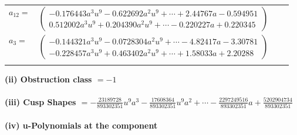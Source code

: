 \documentclass[1p]{elsarticle_modified}
\theoremstyle{definition}
\begin{document}
\begin{tabular}{m{7pt} m{180pt} m{7pt} m{180pt} }
\flushright $a_{12}=$&$\begin{pmatrix}-0.176443 a^{3} u^{9}-0.622692 a^{2} u^{9}+\cdots+2.44767 a-0.594951\\0.512002 a^{3} u^{9}+0.204390 a^{2} u^{9}+\cdots-0.220227 a+0.220345\end{pmatrix}$ \\
\flushright $a_{3}=$&$\begin{pmatrix}-0.144321 a^{3} u^{9}-0.0728304 a^{2} u^{9}+\cdots-4.82417 a-3.30781\\-0.228457 a^{3} u^{9}+0.463402 a^{2} u^{9}+\cdots+1.58033 a+2.20288\end{pmatrix}$\\&\end{tabular}
\flushleft \textbf{(ii) Obstruction class $= -1$}\\~\\
\flushleft \textbf{(iii) Cusp Shapes $= -\frac{23189728}{893302351} u^9 a^3-\frac{17608364}{893302351} u^9 a^2+\cdots-\frac{2297249516}{893302351} a+\frac{5202904734}{893302351}$}\\~\\
\newpage\renewcommand{\arraystretch}{1}
\flushleft \textbf{(iv) u-Polynomials at the component}\newline \\
\end{document}
